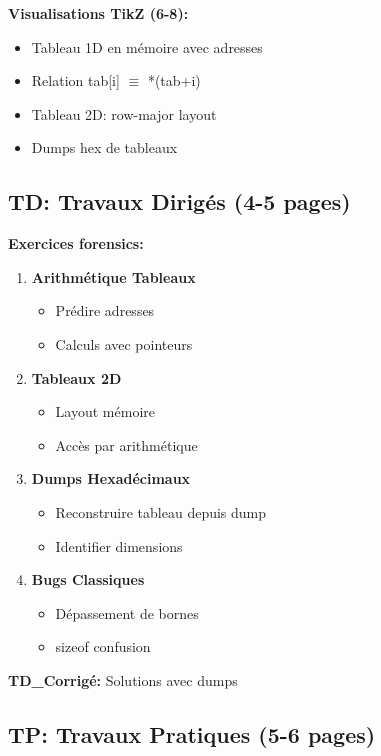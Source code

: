 \documentclass[10pt,a4paper]{article}
\begin{document}
\textbf{Visualisations TikZ (6-8):}
\begin{itemize}
\item Tableau 1D en mémoire avec adresses
\item Relation tab[i] $\equiv$ *(tab+i)
\item Tableau 2D: row-major layout
\item Dumps hex de tableaux
\end{itemize}

\subsection*{TD: Travaux Dirigés (4-5 pages)}

\textbf{Exercices forensics:}
\begin{enumerate}
\item \textbf{Arithmétique Tableaux}
   \begin{itemize}
   \item Prédire adresses
   \item Calculs avec pointeurs
   \end{itemize}

\item \textbf{Tableaux 2D}
   \begin{itemize}
   \item Layout mémoire
   \item Accès par arithmétique
   \end{itemize}

\item \textbf{Dumps Hexadécimaux}
   \begin{itemize}
   \item Reconstruire tableau depuis dump
   \item Identifier dimensions
   \end{itemize}

\item \textbf{Bugs Classiques}
   \begin{itemize}
   \item Dépassement de bornes
   \item sizeof confusion
   \end{itemize}
\end{enumerate}

\textbf{TD\_Corrigé:} Solutions avec dumps

\subsection*{TP: Travaux Pratiques (5-6 pages)}
\end{document}
